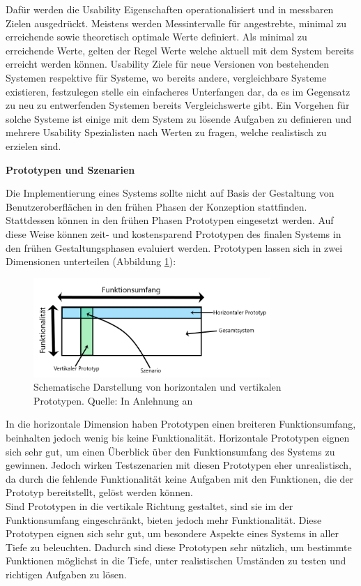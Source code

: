 Dafür werden die Usability Eigenschaften operationalisiert und in messbaren Zielen ausgedrückt. Meistens werden Messintervalle für angestrebte, minimal zu erreichende
sowie theoretisch optimale Werte definiert. Als minimal zu erreichende Werte, gelten der Regel Werte welche aktuell mit dem System bereits erreicht werden können. 
Usability Ziele für neue Versionen von bestehenden Systemen respektive für Systeme, wo bereits andere, vergleichbare Systeme existieren, festzulegen stelle ein einfacheres Unterfangen dar, da es im Gegensatz zu neu zu entwerfenden Systemen bereits Vergleichswerte gibt. Ein Vorgehen für solche Systeme ist einige mit dem System zu lösende Aufgaben zu definieren und mehrere Usability Spezialisten nach Werten zu fragen, welche realistisch zu erzielen sind. \cite[S.~79]{Nielsen1994}

\vspace{5mm} 
\textbf{Prototypen und Szenarien}

Die Implementierung eines Systems sollte nicht auf Basis der Gestaltung von Benutzeroberflächen in den frühen Phasen der Konzeption stattfinden. 
Stattdessen können in den frühen Phasen Prototypen eingesetzt werden. Auf diese Weise können zeit- und kostensparend Prototypen des finalen Systems in den frühen Gestaltungsphasen
evaluiert werden. Prototypen lassen sich in zwei Dimensionen unterteilen \cite[S.~93]{Nielsen1994} (Abbildung \ref{img:ver_hor_protptypes}): 

\begin{figure}[H]
	\centering
	\includegraphics[width=0.8\textwidth]{resources/fundamentals/hor_ver_prototypes.png}
	\caption{Schematische Darstellung von horizontalen und vertikalen Prototypen. Quelle: In Anlehnung an \cite[S.~94]{Nielsen1994}}
	\label{img:ver_hor_protptypes}
\end{figure}

In die horizontale Dimension haben Prototypen einen breiteren Funktionsumfang, beinhalten jedoch wenig bis keine Funktionalität. Horizontale Prototypen eignen sich sehr gut, um einen Überblick über den Funktionsumfang des Systems zu gewinnen. Jedoch wirken Testszenarien mit diesen Prototypen eher unrealistisch, da durch die fehlende Funktionalität keine Aufgaben mit den Funktionen, die der Prototyp 
bereitstellt, gelöst werden können.\\
Sind Prototypen in die vertikale Richtung gestaltet, sind sie im der Funktionsumfang eingeschränkt, bieten jedoch mehr Funktionalität. Diese Prototypen eignen sich sehr gut, um 
besondere Aspekte eines Systems in aller Tiefe zu beleuchten. Dadurch sind diese Prototypen sehr nützlich, um bestimmte Funktionen möglichst in die Tiefe, unter realistischen 
Umständen zu testen und richtigen Aufgaben zu lösen.

